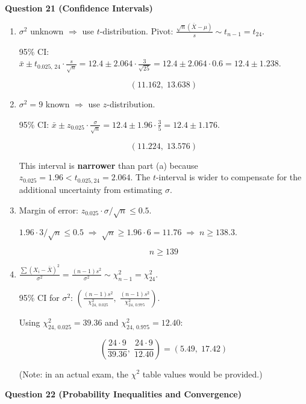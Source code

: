 \documentclass[11pt]{article}
\begin{document}
\bigskip

\textbf{Question 21 (Confidence Intervals)}

\begin{enumerate}[label=(\alph*)]
\item $\sigma^2$ unknown $\Rightarrow$ use $t$-distribution. Pivot: $\frac{\sqrt{n}(\bar X - \mu)}{s} \sim t_{n-1} = t_{24}$.

95\% CI: $\bar x \pm t_{0.025,\,24}\cdot\frac{s}{\sqrt{n}} = 12.4 \pm 2.064 \cdot \frac{3}{\sqrt{25}} = 12.4 \pm 2.064 \cdot 0.6 = 12.4 \pm 1.238$.

$$\boxed{(11.162,\; 13.638)}$$

\item $\sigma^2 = 9$ known $\Rightarrow$ use $z$-distribution.

95\% CI: $\bar x \pm z_{0.025}\cdot\frac{\sigma}{\sqrt{n}} = 12.4 \pm 1.96 \cdot \frac{3}{5} = 12.4 \pm 1.176$.

$$\boxed{(11.224,\; 13.576)}$$

This interval is \textbf{narrower} than part (a) because $z_{0.025} = 1.96 < t_{0.025,24} = 2.064$. The $t$-interval is wider to compensate for the additional uncertainty from estimating $\sigma$.

\item Margin of error: $z_{0.025}\cdot\sigma/\sqrt{n} \le 0.5$.

$1.96 \cdot 3/\sqrt{n} \le 0.5 \;\Rightarrow\; \sqrt{n} \ge 1.96 \cdot 6 = 11.76 \;\Rightarrow\; n \ge 138.3$.

$$\boxed{n \ge 139}$$

\item $\frac{\sum(X_i - \bar X)^2}{\sigma^2} = \frac{(n-1)s^2}{\sigma^2} \sim \chi^2_{n-1} = \chi^2_{24}$.

95\% CI for $\sigma^2$: $\left(\frac{(n-1)s^2}{\chi^2_{24,\,0.025}},\; \frac{(n-1)s^2}{\chi^2_{24,\,0.975}}\right)$.

Using $\chi^2_{24,\,0.025} = 39.36$ and $\chi^2_{24,\,0.975} = 12.40$:

$$\boxed{\left(\frac{24 \cdot 9}{39.36},\; \frac{24 \cdot 9}{12.40}\right) = \left(5.49,\; 17.42\right)}$$

(Note: in an actual exam, the $\chi^2$ table values would be provided.)
\end{enumerate}

\bigskip

\textbf{Question 22 (Probability Inequalities and Convergence)}
\end{document}

